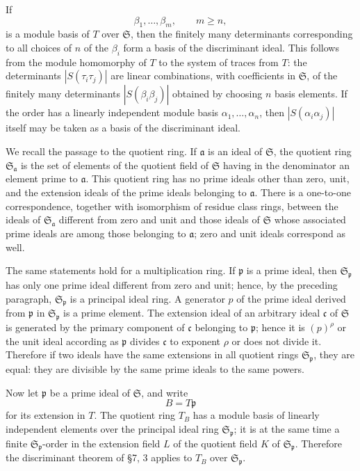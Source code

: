 \documentclass[11pt]{article}
\begin{document}
If \[
  \beta_1,
\ldots,
\beta_m,
  \qquad m\ge n,
\] is a module basis of \(T\) over \(\mathfrak S\), then the finitely
many determinants corresponding to all choices of \(n\) of the
\(\beta_i\) form a basis of the discriminant ideal. This follows from
the module homomorphy of \(T\) to the system of traces from \(T\): the
determinants \(|S(\tau_i\tau_j)|\) are linear combinations, with
coefficients in \(\mathfrak S\), of the finitely many determinants
\(|S(\beta_i\beta_j)|\) obtained by choosing \(n\) basis elements. If
the order has a linearly independent module basis \(\alpha_1,
\ldots,
\alpha_n\), then \(|S(\alpha_i\alpha_j)|\) itself may be taken as a
basis of the discriminant ideal.

We recall the passage to the quotient ring. If \(\mathfrak a\) is an
ideal of \(\mathfrak S\), the quotient ring
\(\mathfrak S_{\mathfrak a}\) is the set of elements of the quotient
field of \(\mathfrak S\) having in the denominator an element prime to
\(\mathfrak a\). This quotient ring has no prime ideals other than zero,
unit, and the extension ideals of the prime ideals belonging to
\(\mathfrak a\). There is a one-to-one correspondence, together with
isomorphism of residue class rings, between the ideals of
\(\mathfrak S_{\mathfrak a}\) different from zero and unit and those
ideals of \(\mathfrak S\) whose associated prime ideals are among those
belonging to \(\mathfrak a\); zero and unit ideals correspond as well.

The same statements hold for a multiplication ring. If \(\mathfrak p\)
is a prime ideal, then \(\mathfrak S_{\mathfrak p}\) has only one prime
ideal different from zero and unit; hence, by the preceding paragraph,
\(\mathfrak S_{\mathfrak p}\) is a principal ideal ring. A generator
\(p\) of the prime ideal derived from \(\mathfrak p\) in
\(\mathfrak S_{\mathfrak p}\) is a prime element. The extension ideal of
an arbitrary ideal \(\mathfrak c\) of \(\mathfrak S\) is generated by
the primary component of \(\mathfrak c\) belonging to \(\mathfrak p\);
hence it is \((p)^{\rho}\) or the unit ideal according as
\(\mathfrak p\) divides \(\mathfrak c\) to exponent \(\rho\) or does not
divide it. Therefore if two ideals have the same extensions in all
quotient rings \(\mathfrak S_{\mathfrak p}\), they are equal: they are
divisible by the same prime ideals to the same powers.

Now let \(\mathfrak p\) be a prime ideal of \(\mathfrak S\), and write
\[
  B=T\mathfrak p
\] for its extension in \(T\). The quotient ring \(T_{B}\) has a module
basis of linearly independent elements over the principal ideal ring
\(\mathfrak S_{\mathfrak p}\); it is at the same time a finite
\(\mathfrak S_{\mathfrak p}\)-order in the extension field \(L\) of the
quotient field \(K\) of \(\mathfrak S_{\mathfrak p}\). Therefore the
discriminant theorem of §7, 3 applies to \(T_B\) over
\(\mathfrak S_{\mathfrak p}\).
\end{document}
